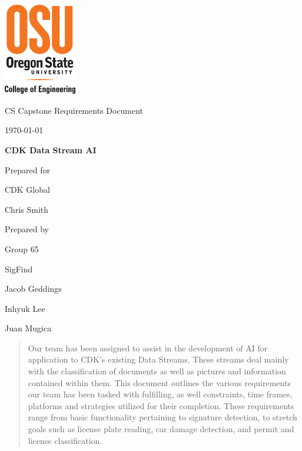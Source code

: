 \documentclass[onecolumn, draftclsnofoot,10pt, compsoc]{IEEEtran}
\def \CapstoneTeamName{		SigFind}
\def \CapstoneTeamNumber{		65}
\def \GroupMemberOne{			Jacob Geddings}
\def \GroupMemberTwo{			Inhyuk Lee}
\def \GroupMemberThree{			Juan Mugica}
\def \CapstoneProjectName{		CDK Data Stream AI}
\def \CapstoneSponsorCompany{	CDK Global}
\def \CapstoneSponsorPerson{		Chris Smith}
\def \DocType{		%
				Requirements Document
				}
\begin{document}
\begin{titlepage}
    \begin{singlespace}
    	\includegraphics[height=4cm]{coe_v_spot1}
        \hfill 
        \par\vspace{.2in}
        \centering
        \scshape{
            \huge CS Capstone \DocType \par
            {\large\today}\par
            \vspace{.5in}
            \textbf{\Huge\CapstoneProjectName}\par
            \vfill
            {\large Prepared for}\par
            \Huge \CapstoneSponsorCompany\par
            \vspace{5pt}
            {\Large\CapstoneSponsorPerson\par}
            {\large Prepared by }\par
            Group\CapstoneTeamNumber\par
            \CapstoneTeamName\par 
            \vspace{5pt}
            {\Large
                \GroupMemberOne\par
                \GroupMemberTwo\par
               \GroupMemberThree\par
            }
            \vspace{20pt}
        }
        \begin{abstract}
		Our team has been assigned to assist in the development of AI for application to CDK’s existing Data Streams.
		 These streams deal mainly with the classification of documents as well as pictures and information contained within them. 
		This document outlines the various requirements our team has been tasked with fulfilling, as well constraints, time frames, platforms and strategies utilized for their completion.
		These requirements range from basic functionality pertaining to signature detection, to stretch goals such as license plate reading, car damage detection, and permit and license classification.
		
        \end{abstract}     
    \end{singlespace}
\end{titlepage}
\end{document}
